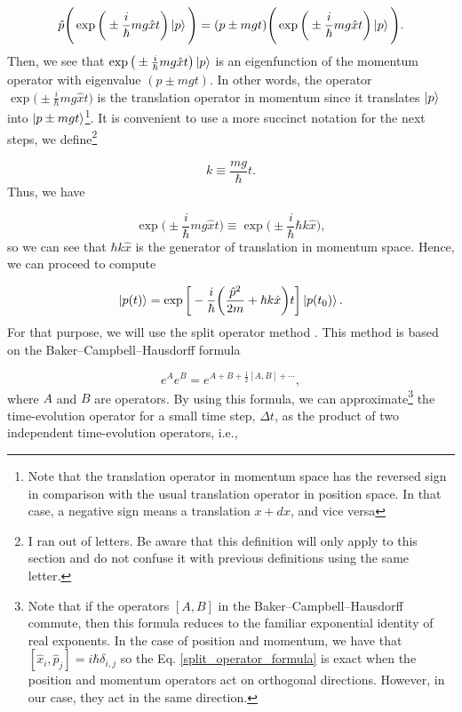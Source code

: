\documentclass{article}
\begin{document}
\begin{equation}
    \hat{p} \Bigg( \exp \bigg(\pm \frac{i}{\hbar} mg \hat{x} t \bigg) \ket{p} \Bigg) = (p\pm mgt) \Bigg( \exp \bigg(\pm \frac{i}{\hbar} mg \hat{x} t \bigg) \ket{p} \Bigg).
\end{equation}
%
Then, we see that $\exp \big(\pm \frac{i}{\hbar} mg \hat{x} t \big) \ket{p}$ is an eigenfunction of the momentum operator with eigenvalue $(p\pm mgt)$. In other words, the operator $\exp \big(\pm \frac{i}{\hbar} mg \hat{x} t \big)$ is the translation operator in momentum since it translates $\ket{p}$ into $\ket{p\pm mgt}$\footnote{Note that the translation operator in momentum space has the reversed sign in comparison with the usual translation operator in position space. In that case, a negative sign means a translation $x+dx$, and vice versa}. It is convenient to use a more succinct notation for the next steps, we define\footnote{I ran out of letters. Be aware that this definition will only apply to this section and do not confuse it with previous definitions using the same letter.}

\begin{equation}
    k \equiv \frac{mg}{\hbar} t.
\end{equation}
%
Thus, we have

\begin{equation}
    \exp \bigg(\pm \frac{i}{\hbar} mg \hat{x} t \bigg) \equiv \exp \bigg(\pm \frac{i}{\hbar} \hbar k \hat{x} \bigg),
\end{equation}
%
so we can see that $\hbar k \hat{x}$ is the generator of translation in momentum space. Hence, we can proceed to compute

\begin{equation}
    \ket{p(t)} = \exp \bigg[-\frac{i}{\hbar} \bigg( \frac{\hat{p}^{2}}{2m} + \hbar k \hat{x} \bigg) t \bigg] \ket{p(t_{0})}.
\end{equation}
%
For that purpose, we will use the split operator method \cite{FEIT1982412, LEFORESTIER199159, MAKSYM201966, MacNamara2016}. This method is based on the Baker–Campbell–Hausdorff formula

\begin{equation}
    e^{A}e^{B} = e^{A+B+\frac{1}{2}[A, B] + \cdots},
\end{equation}
%
where $A$ and $B$ are operators. By using this formula, we can approximate\footnote{Note that if the operators $[A,B]$ in the Baker–Campbell–Hausdorff commute, then this formula reduces to the familiar exponential identity of real exponents. In the case of position and momentum, we have that $[\hat{x}_{i},\hat{p}_{j}]=i\hbar \delta_{i,j}$ so the Eq. \ref{split_operator_formula} is exact when the position and momentum operators act on orthogonal directions. However, in our case, they act in the same direction.} the time-evolution operator for a small time step, $\Delta t$, as the product of two independent time-evolution operators, i.e.,
\end{document}
